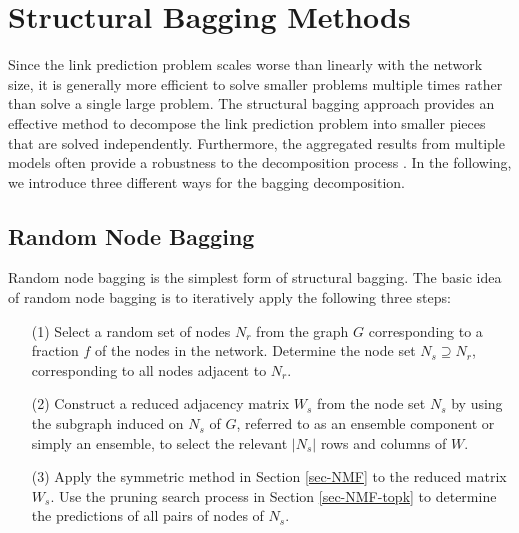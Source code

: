 \section{Structural Bagging Methods}
\label{sec-bagging}
Since the link prediction problem scales worse than
linearly with the network size, it is generally more efficient to
solve smaller problems multiple times rather than solve a single
large problem.
The structural bagging approach provides an effective method to decompose
the link prediction problem into smaller pieces that are solved
independently.
Furthermore, the aggregated results from multiple models often
provide a robustness to the decomposition process  \cite{Breiman96b-1996}. In the
following, we introduce three different ways for the bagging decomposition.

\subsection{Random Node Bagging}

Random node bagging is the simplest form of structural bagging. The basic
idea of random node bagging is to iteratively apply the following
three steps:

\vspace{-1ex}
\begin{enumerate}

\item[(1)] Select a random set of nodes $N_r$ from the graph $G$ corresponding to
a fraction $f$ of the nodes in the network. Determine the node set
$N_s \supseteq N_r$, corresponding to all nodes adjacent to $N_r$.
\item[(2)]  Construct a reduced
adjacency matrix $W_s$ from the node set $N_s$ by using the subgraph
induced on $N_s$ of $G$, referred to as an ensemble component or simply an ensemble, to select the relevant $|N_s|$ rows and columns of $W$.
\item[(3)]  Apply the symmetric \NMF method in Section \ref{sec-NMF}
to the reduced matrix $W_s$.  Use the  pruning search
process in Section \ref{sec-NMF-topk} to determine the predictions of all pairs of nodes of $N_s$.
\end{enumerate}
\vspace{-1ex}


